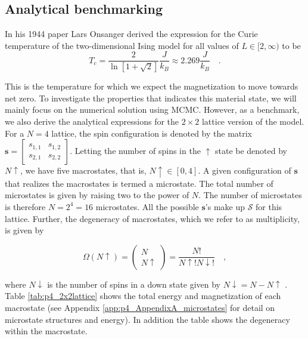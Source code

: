 \documentclass[../main_proj4_correct_template.tex]{subfiles}
\begin{document}
\subsection{Analytical benchmarking}\label{sec:p4_method_benchmark}

In his 1944 paper Lars Onsanger derived the expression for the Curie temperature of the two-dimensional Ising model for all values of $L\in[2, \infty)$ to be \cite{onsanger_crystal_stat} 
\begin{equation}
    \label{eq:p4_critical_temp}
    T_c = \frac{2}{\ln[1 + \sqrt{2}]} \frac{J}{k_B} \approx 2.269 \frac{J}{k_B} \quad.
\end{equation}

\noindent This is the temperature for which we expect the magnetization to move towards net zero. To investigate the properties that indicates this material state, we will mainly focus on the numerical solution using MCMC. However, as a benchmark, we also derive the analytical expressions for the $2\times 2$ lattice version of the model. For a $N=4$ lattice, the spin configuration is denoted by the matrix $\mathbf{s} = \begin{bmatrix} s_{1,1} & s_{1,2} \\ s_{2,1} & s_{2,2}\end{bmatrix}$. Letting the number of spins in the $\uparrow$ state be denoted by $N\uparrow$, we have five macrostates, that is, $N\uparrow \in [0, 4]$. A given configuration of $\mathbf{s}$ that realizes the macrostates is termed a microstate. The total number of microstates is given by raising two to the power of $N$. The number of microstates is therefore $N = 2^{4}=16$ microstates. All the possible $\mathbf{s}$'s make up $\mathcal{S}$ for this lattice. Further, the degeneracy of macrostates, which we refer to as multiplicity, is given by

\begin{equation}
    \label{eq:p4_multiplicty}
    \Omega(N\uparrow) = \begin{pmatrix} N \\ N\uparrow \end{pmatrix} = \frac{N!}{N \uparrow ! N \downarrow !} \quad,
\end{equation}

\noindent where $N \downarrow$ is the number of spins in a down state given by $N\downarrow = N - N \uparrow$ \cite{thermal_physics}. Table \ref{tab:p4_2x2lattice} shows the total energy and magnetization of each macrostate (see Appendix \ref{app:p4_AppendixA_microstates} for detail on microstate structures and energy). In addition the table shows the degeneracy within the macrostate.
\end{document}
